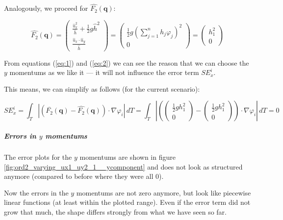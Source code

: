 \documentclass{article}
\renewcommand{\phi}{\varphi}
\begin{document}
Analogously, we proceed for $\widehat{F_2}(\mathbf{q})$:

\begin{equation}
  \label{eq:2}
  \widehat{F_2}(\mathbf{q}) =
  \begin{pmatrix}
    \frac{\widehat{u}_x^2}{\widehat h} + \frac{1}{2} g \widehat h ^2 \\
    \frac{\widehat u_x \cdot \widehat u_y}{\widehat h}
  \end{pmatrix} =
  \begin{pmatrix}
    \frac{1}{2} g \left( \sum_{j=1}^n h_j \phi_j \right) ^2 \\
    0
  \end{pmatrix} =
  \begin{pmatrix}
    h_1^2 \\ 0
  \end{pmatrix}
\end{equation}

From equations (\ref{eq:1}) and (\ref{eq:2}) we can see the reason that we can choose the $y$ momentums as we like it --- it will not influence the error term $SE_x^i$.

This means, we can simplify as follows (for the current scenario):

\begin{equation*}
  SE_x^i = \int_T \left| \left(\overline{F_2}(\mathbf{q}) - \widehat{F_2}(\mathbf{q})\right) \cdot \nabla \phi_i \right|\, dT = \int_T \left|
    \left(
      \begin{pmatrix}
        \frac{1}{2} g h_1^2 \\ 0
      \end{pmatrix} -
      \begin{pmatrix}
        \frac{1}{2} g h_1^2 \\ 0
      \end{pmatrix}
    \right)
    \cdot \nabla \phi_i \right|\, dT =
  0
\end{equation*}

\subparagraph{\texorpdfstring{Errors in $y$ momentums}{Errors in y momentums}}

The error plots for the $y$ momentums are shown in figure \ref{fig:ord2_varying_ux1_uy2_1__ycomponent} and does not look as structured anymore (compared to before where they were all 0).



Now the errors in the $y$ momentums are not zero anymore, but look like piecewise linear functions (at least within the plotted range). Even if the error term did not grow that much, the shape differs strongly from what we have seen so far.
\end{document}
